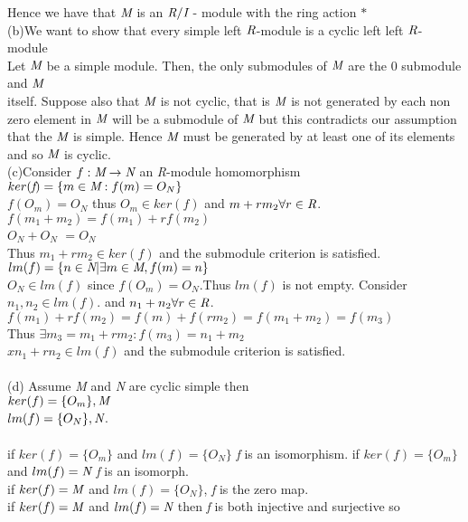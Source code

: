 \documentclass{article}
\begin{document}
Hence we have that $\emph{M}$ is an $\emph{R}/\emph{I}$ - module with the ring action $*$\\
(b)We want to show that every simple left $\emph{R}$-module 
is a cyclic left left $\emph{R}$-module\\
Let $\emph{M}$ be a simple module. Then, the only submodules of $\emph{M}$
 are the 0 submodule and $\emph{M}$\\
itself. Suppose also that $\emph{M}$ is not cyclic, that is $\emph{M}$ 
is not generated by each non zero element in $\emph{M}$
will be a submodule of $\emph{M}$ but this contradicts our assumption that the $\emph{M}$ is simple.
 Hence $\emph{M}$ must be generated by at least one of its 
elements and so $\emph{M}$ is cyclic.\\
(c)Consider $f:\emph{M}\to\emph{N}$ an \emph{R}-module homomorphism\\
$ker(\emph{f}) = \{m\in\emph{M}:f(m)=O_N\}$\\
$f(O_m)=O_N$ thus $O_m\in ker(f)$ and $m+rm_2\forall r\in\emph{R}$.\\
$f(m_1+m_2)=f(m_1)+rf(m_2)$\\
$O_N +O_N$
$=O_N$\\
Thus $m_1 + rm_2\in ker(f)$ and the submodule criterion is satisfied.\\
$lm(f)= \{n\in \emph{N}\vert\exists m\in\emph{M}, f(m)=n\}$\\
$O_N\in lm(f)$ since $f(O_m)=O_N$.Thus $lm(f)$ is not empty. Consider  $n_1,n_2\in lm(f).$
and $n_1 +n_2 \forall r\in\emph{R}$.\\
$f(m_1) +rf(m_2) = f(m)+f(rm_2) =f(m_1+m_2) = f(m_3)$\\
Thus $\exists m_3 = m_1+rm_2:f(m_3) =n_1+m_2$\\
$x n_1+rn_2\in lm(f)$ and the submodule criterion is satisfied.\\
\\
(d) Assume \emph{M} and \emph{N} are cyclic simple then\\
$ker(f) =\{O_m\}, \emph{M}$\\
$lm(f) = \{O_N\}, \emph{N}$.\\\\
if $ker(f) = \{O_m\}$ and $lm(f) = \{O_N\}$ \emph{f} is an isomorphism. 
if $ker(f) = \{O_m\}$ and $lm(f) = \emph{N}$ \emph{f} is an isomorph.\\
if $ker(f) = \emph{M}$ and $lm(f) = \{O_N\}$, \emph{f} is the zero map.\\
if $ker(f) = \emph{M}$ and $lm(f) = \emph{N}$ then \emph{f} is both injective and surjective so
\end{document}
